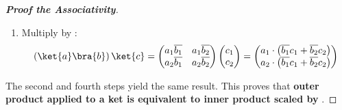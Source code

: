 \begin{proof}[\textbf{Proof the Associativity}]
\begin{enumerate}
        \item Multiply  by :
        \begin{equation*}
            \left(\ket{a}\bra{b}\right) \ket{c} =
            \begin{pmatrix}
                a_{1}\overline{b_{1}} & a_{1}\overline{b_{2}} \\
                a_{2}\overline{b_{1}} & a_{2}\overline{b_{2}}
            \end{pmatrix}
            \begin{pmatrix}
                c_{1} \\
                c_{2}
            \end{pmatrix}
            =
            \begin{pmatrix}
                a_{1} \cdot \left( \overline{b_{1}} c_{1} + \overline{b_{2}} c_{2} \right) \\
                a_{2} \cdot \left( \overline{b_{1}} c_{1} + \overline{b_{2}} c_{2} \right)
            \end{pmatrix}
        \end{equation*}
    \end{enumerate}
    The second and fourth steps yield the same result.
    This proves that \textbf{outer product applied to a ket is equivalent to inner product  scaled by }.
\end{proof}
